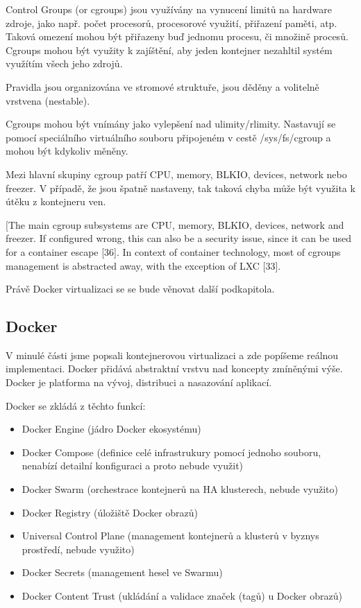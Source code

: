 \documentclass[thesis=M,czech]{FITthesis}[2019/12/23]
\theoremstyle{plain}
\theoremstyle{definition}
\begin{document}
Control Groups (or cgroups) jsou využívány na vynucení limitů na hardware zdroje, jako např. počet procesorů, procesorové využití, přiřazení paměti, atp. Taková omezení mohou být přiřazeny buď jednomu procesu, či množině procesů. Cgroups mohou být využity k zajíštění, aby jeden kontejner nezahltil systém využítím všech jeho zdrojů. 

Pravidla jsou organizována ve stromové struktuře, jsou děděny a volitelně vrstvena (nestable).

Cgroups mohou být vnímány jako vylepšení nad ulimity/rlimity. Nastavují se pomocí speciálního virtuálního souboru připojeném v cestě /sys/fs/cgroup a mohou být kdykoliv měněny.

Mezi hlavní skupiny cgroup patří CPU, memory, BLKIO, devices, network nebo freezer. V případě, že jsou špatně nastaveny, tak taková chyba může být využita k útěku z kontejneru ven. 

[The main cgroup subsystems are CPU, memory, BLKIO,
devices, network and freezer. If configured wrong, this can also be a security issue, since
it can be used for a container escape [36]. In context of container technology, most of
cgroups management is abstracted away, with the exception of LXC [33].


 Právě Docker virtualizaci se se bude věnovat další podkapitola.

\subsection{Docker}

V minulé části jsme popsali kontejnerovou virtualizaci a zde popíšeme reálnou implementaci. Docker přidává abstraktní vrstvu nad koncepty zmíněnými výše. Docker je platforma na vývoj, distribuci a nasazování aplikací. 

Docker se zkládá z těchto funkcí:


\begin{itemize}  
\item Docker Engine (jádro Docker ekosystému)
\item Docker Compose (definice celé infrastrukury pomocí jednoho souboru, nenabízí detailní konfiguraci a proto nebude využit)
\item Docker Swarm (orchestrace kontejnerů na HA klusterech, nebude využito)
\item Docker Registry (úložiště Docker obrazů)
\item Universal Control Plane (management kontejnerů a klusterů v byznys prostředí, nebude využito)
\item Docker Secrets (management hesel ve Swarmu)
\item Docker Content Trust (ukládání a validace značek (tagů) u Docker obrazů)

\end{itemize}
\end{document}
